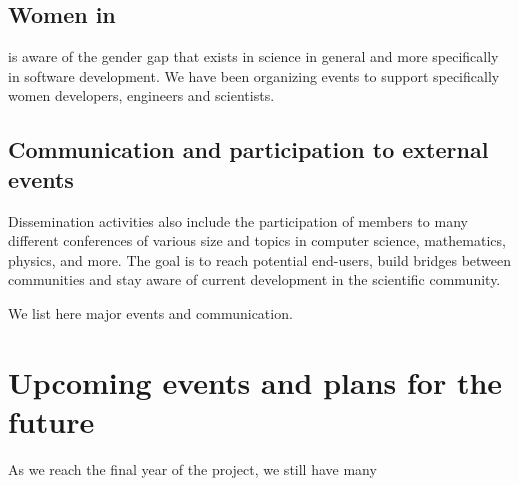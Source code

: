 \documentclass{deliverablereport}
\begin{document}
\subsection{Women in \ODK}

\ODK is aware of the gender gap that exists in science in general
and more specifically in software development. We have been organizing
events to support specifically women developers, engineers and scientists.









\subsection{Communication and participation to external events}

Dissemination activities also include the participation of \ODK
members to many different conferences of various size and topics
in computer science, mathematics, physics, and more. The goal is
to reach potential end-users, build bridges between communities and stay aware 
of current development in the scientific community.

We list here major events and communication. 
























\section{Upcoming events and plans for the future}

As we reach the final year of the project, we still have many 


\newpage\printbibliography
\end{document}

